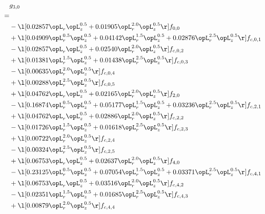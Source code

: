 \begin{alignat}{2} 
\label{eq:g_30_0} 
& g_{3,0} \nonumber \\ 
 = \\ 
& - \l[  0.02857 \opL_r \opL_z^{0.5} +  0.01905 \opL_r^{2.0} \opL_z^{0.5}  \r] f_{0,0} \nonumber \\ 
& + \l[  0.04909 \opL_r^{0.5} \opL_z^{0.5} +  0.04142 \opL_r^{1.5} \opL_z^{0.5} +  0.02876 \opL_r^{2.5} \opL_z^{0.5}  \r] f_{c,0,1} \nonumber \\ 
& - \l[  0.02857 \opL_r \opL_z^{0.5} +  0.02540 \opL_r^{2.0} \opL_z^{0.5}  \r] f_{c,0,2} \nonumber \\ 
& + \l[  0.01381 \opL_r^{1.5} \opL_z^{0.5} +  0.01438 \opL_r^{2.5} \opL_z^{0.5}  \r] f_{c,0,3} \nonumber \\ 
& - \l[  0.00635 \opL_r^{2.0} \opL_z^{0.5}  \r] f_{c,0,4} \nonumber \\ 
& + \l[  0.00288 \opL_r^{2.5} \opL_z^{0.5}  \r] f_{c,0,5} \nonumber \\ 
& + \l[  0.04762 \opL_r \opL_z^{0.5} +  0.02165 \opL_r^{2.0} \opL_z^{0.5}  \r] f_{2,0} \nonumber \\ 
& - \l[  0.16874 \opL_r^{0.5} \opL_z^{0.5} +  0.05177 \opL_r^{1.5} \opL_z^{0.5} +  0.03236 \opL_r^{2.5} \opL_z^{0.5}  \r] f_{c,2,1} \nonumber \\ 
& + \l[  0.04762 \opL_r \opL_z^{0.5} +  0.02886 \opL_r^{2.0} \opL_z^{0.5}  \r] f_{c,2,2} \nonumber \\ 
& - \l[  0.01726 \opL_r^{1.5} \opL_z^{0.5} +  0.01618 \opL_r^{2.5} \opL_z^{0.5}  \r] f_{c,2,3} \nonumber \\ 
& + \l[  0.00722 \opL_r^{2.0} \opL_z^{0.5}  \r] f_{c,2,4} \nonumber \\ 
& - \l[  0.00324 \opL_r^{2.5} \opL_z^{0.5}  \r] f_{c,2,5} \nonumber \\ 
& + \l[  0.06753 \opL_r \opL_z^{0.5} +  0.02637 \opL_r^{2.0} \opL_z^{0.5}  \r] f_{4,0} \nonumber \\ 
& - \l[  0.23125 \opL_r^{0.5} \opL_z^{0.5} +  0.07054 \opL_r^{1.5} \opL_z^{0.5} +  0.03371 \opL_r^{2.5} \opL_z^{0.5}  \r] f_{c,4,1} \nonumber \\ 
& + \l[  0.06753 \opL_r \opL_z^{0.5} +  0.03516 \opL_r^{2.0} \opL_z^{0.5}  \r] f_{c,4,2} \nonumber \\ 
& - \l[  0.02351 \opL_r^{1.5} \opL_z^{0.5} +  0.01685 \opL_r^{2.5} \opL_z^{0.5}  \r] f_{c,4,3} \nonumber \\ 
& + \l[  0.00879 \opL_r^{2.0} \opL_z^{0.5}  \r] f_{c,4,4} \nonumber \\ 

\end{alignat}
